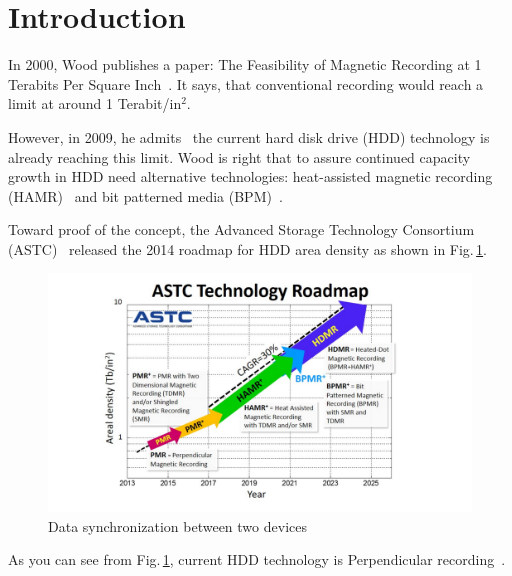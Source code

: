 \section{Introduction}
In 2000, Wood publishes a paper: The Feasibility of Magnetic Recording at 1 Terabits Per Square Inch~\cite{Wood2000}. It says, that conventional recording would reach a limit at around 1 Terabit/in$^2$.

However, in 2009, he admits~\cite{Wood2009} the current hard disk drive (HDD) technology is already reaching this limit. Wood is right that to assure continued capacity growth in HDD need alternative technologies: heat-assisted magnetic recording (HAMR)~\cite{Rottmeyer} and bit patterned media (BPM)~\cite{Terris}. 

Toward proof of the concept, the Advanced Storage Technology Consortium (ASTC)~\cite{ASTC} released the 2014 roadmap for HDD area density as shown in Fig.\,\ref{fig_astc}.

\begin{figure}[!hbt]
\includegraphics[height=0.25\textheight]{ASTC}
\caption{Data synchronization between two devices}
\label{fig_astc}
\end{figure}

As you can see from Fig.\,\ref{fig_astc}, current HDD technology is Perpendicular recording~\cite{HGST}.
